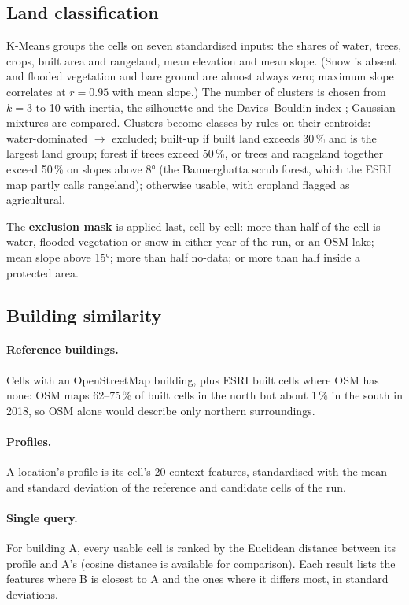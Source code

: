 \subsection{Land classification}

K-Means \citep{pedregosa2011} groups the cells on seven standardised inputs: the shares of water,
trees, crops, built area and rangeland, mean elevation and mean slope. (Snow is absent and
flooded vegetation and bare ground are almost always zero; maximum slope correlates at
$r=0.95$ with mean slope.) The number of clusters is chosen from $k=3$ to 10 with inertia, the
silhouette \citep{rousseeuw1987} and the Davies--Bouldin index \citep{davies1979}; Gaussian
mixtures are compared. Clusters become classes by rules on their centroids:
water-dominated $\rightarrow$ excluded; built-up if built land exceeds 30\,\% and is the largest
land group; forest if trees exceed 50\,\%, or trees and rangeland together exceed 50\,\% on
slopes above \ang{8} (the Bannerghatta scrub forest, which the ESRI map partly calls rangeland);
otherwise usable, with cropland flagged as agricultural.

The \textbf{exclusion mask} is applied last, cell by cell: more than half of the cell is water,
flooded vegetation or snow in either year of the run, or an OSM lake; mean slope above
\ang{15}; more than half no-data; or more than half inside a protected area.

\subsection{Building similarity}\label{sec:similarity}

\paragraph{Reference buildings.} Cells with an OpenStreetMap building, plus ESRI built cells
where OSM has none: OSM maps 62--75\,\% of built cells in the north but about 1\,\% in the south
in 2018, so OSM alone would describe only northern surroundings.

\paragraph{Profiles.} A location's profile is its cell's 20 context features, standardised with
the mean and standard deviation of the reference and candidate cells of the run.

\paragraph{Single query.} For building A, every usable cell is ranked by the Euclidean distance
between its profile and A's (cosine distance is available for comparison). Each result lists
the features where B is closest to A and the ones where it differs most, in standard deviations.

